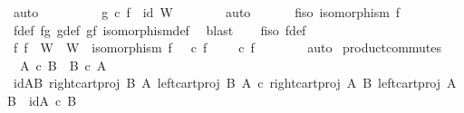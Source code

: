 \begin{isabellebody}
\ auto\isanewline
\ \ \ \ \isamarkupfalse%
\ {}\ {}\ \isamarkupfalse%
\ {\isachardoublequoteopen}g\ {\isasymcirc}\isactrlsub c\ f\ {\isacharequal}{\kern0pt}\ id\ W{\isachardoublequoteclose}\isanewline
\ \ \ \ \ \ \isamarkupfalse%
\ auto\isanewline
\ \ \isamarkupfalse%
\isanewline
\isanewline
\ \ \isamarkupfalse%
\ f{\isacharunderscore}{\kern0pt}iso{\isacharcolon}{\kern0pt}\ {\isachardoublequoteopen}isomorphism\ f{\isachardoublequoteclose}\isanewline
\ \ \ \ \isamarkupfalse%
\ f{\isacharunderscore}{\kern0pt}def\ fg\ g{\isacharunderscore}{\kern0pt}def\ gf\ isomorphism{\isacharunderscore}{\kern0pt}def{}\ \isamarkupfalse%
\ blast\isanewline
\ \ \isamarkupfalse%
\ f{\isacharunderscore}{\kern0pt}iso\ f{\isacharunderscore}{\kern0pt}def\ \isamarkupfalse%
\ {\isachardoublequoteopen}{\isasymexists}f{\isachardot}{\kern0pt}\ f\ {\isacharcolon}{\kern0pt}\ W\ {\isasymrightarrow}\ W{\isacharprime}{\kern0pt}\ {\isasymand}\ isomorphism\ f\ {\isasymand}\ {\isasympi}{\isacharprime}{\kern0pt}\ {\isasymcirc}\isactrlsub c\ f\ {\isacharequal}{\kern0pt}\ {\isasympi}\ {\isasymand}\ {\isasympi}{\isacharprime}{\kern0pt}\ {\isasymcirc}\isactrlsub c\ f\ {\isacharequal}{\kern0pt}\ {\isasympi}\isanewline
\ \ \ \ \isamarkupfalse%
\ auto\isanewline
{}\isamarkupfalse%
%
\endisatagproof
{\isafoldproof}%
%
\isadelimproof
\isanewline
%
\endisadelimproof
\isanewline
{}\isamarkupfalse%
\ product{\isacharunderscore}{\kern0pt}commutes{\isacharcolon}{\kern0pt}\isanewline
\ \ {\isachardoublequoteopen}A\ {\isasymtimes}\isactrlsub c\ B\ {\isasymcong}\ B\ {\isasymtimes}\isactrlsub c\ A{\isachardoublequoteclose}\isanewline
%
\isadelimproof
%
\endisadelimproof
%
\isatagproof
{}\isamarkupfalse%
\ {\isacharminus}{\kern0pt}\isanewline
\ \ \isamarkupfalse%
\ id{\isacharunderscore}{\kern0pt}AB{\isacharcolon}{\kern0pt}\ {\isachardoublequoteopen}{\isasymlangle}right{\isacharunderscore}{\kern0pt}cart{\isacharunderscore}{\kern0pt}proj\ B\ A{\isacharcomma}{\kern0pt}\ left{\isacharunderscore}{\kern0pt}cart{\isacharunderscore}{\kern0pt}proj\ B\ A{\isasymrangle}\ {\isasymcirc}\isactrlsub c\ {\isasymlangle}right{\isacharunderscore}{\kern0pt}cart{\isacharunderscore}{\kern0pt}proj\ A\ B{\isacharcomma}{\kern0pt}\ left{\isacharunderscore}{\kern0pt}cart{\isacharunderscore}{\kern0pt}proj\ A\ B{\isasymrangle}\ {\isacharequal}{\kern0pt}\ id{\isacharparenleft}{\kern0pt}A\ {\isasymtimes}\isactrlsub c\ B{\isacharparenright}{\kern0pt}{\isachardoublequoteclose}\isanewline

\end{isabellebody}
